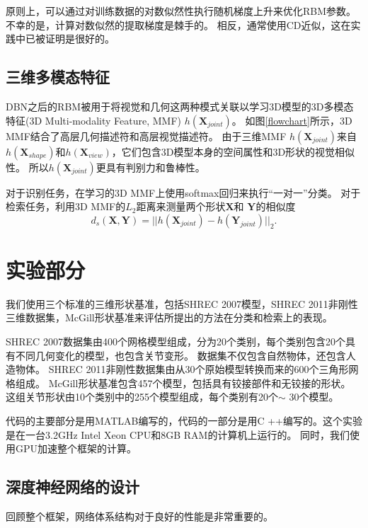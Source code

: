 原则上，可以通过对训练数据的对数似然性执行随机梯度上升来优化RBM参数。 不幸的是，计算对数似然的提取梯度是棘手的。 相反，通常使用CD近似\cite{Hinton2002Training}，这在实践中已被证明是很好的。


\subsection{三维多模态特征}


DBN之后的RBM被用于将视觉和几何这两种模式关联以学习3D模型的3D多模态特征(3D Multi-modality Feature, MMF) $h(\mathbf{X}_{joint})$。 如图\ref{flowchart}所示，3D MMF结合了高层几何描述符和高层视觉描述符。 由于三维MMF $h(\mathbf{X}_{joint})$来自$h(\mathbf{X}_{shape})$和$h(\mathbf{X}_{view})$，它们包含3D模型本身的空间属性和3D形状的视觉相似性。 所以$h(\mathbf{X}_{joint})$更具有判别力和鲁棒性。

对于识别任务，在学习的3D MMF上使用softmax回归来执行“一对一”分类。 对于检索任务，利用3D MMF的$L_2$距离来测量两个形状$\mathbf{X}$和 $\mathbf{Y}$的相似度
%
\begin{equation}
 d_s(\mathbf{X}, \mathbf{Y}) = || h(\mathbf{X}_{joint}) - h(\mathbf{Y}_{joint}) ||_2 \label{cal_cal_distance}.
\end{equation}

\section{实验部分}
我们使用三个标准的三维形状基准，包括SHREC 2007模型\cite{giorgi2007watertight}，SHREC 2011非刚性三维数据集\cite{Lian2011SHREC}，McGill形状基准\cite{zhang2005retrieving}来评估所提出的方法在分类和检索上的表现。

SHREC 2007数据集由400个网格模型组成，分为20个类别，每个类别包含20个具有不同几何变化的模型，也包含关节变形。 数据集不仅包含自然物体，还包含人造物体。 SHREC 2011非刚性数据集由从30个原始模型转换而来的600个三角形网格组成。 McGill形状基准包含457个模型，包括具有铰接部件和无铰接的形状。 这组关节形状由10个类别中的255个模型组成，每个类别有20个$ \sim $ 30个模型。

代码的主要部分是用MATLAB编写的，代码的一部分是用C ++编写的。这个实验是在一台3.2GHz Intel Xeon CPU和8GB RAM的计算机上运行的。 同时，我们使用GPU加速整个框架的计算。

\subsection{深度神经网络的设计}
回顾整个框架，网络体系结构对于良好的性能是非常重要的。

